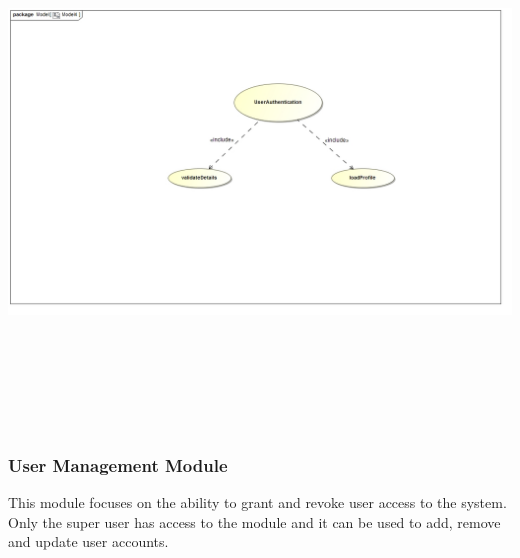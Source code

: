 \documentclass[english]{article}
\begin{document}
		\includegraphics[width=14cm,height=14cm,keepaspectratio]{Authenticate.jpg}

		\newpage
		\subsubsection{User Management Module}
		This module focuses on the ability to grant and revoke user access to the system. Only the super user has access to the module and it can be used to add, remove and update user accounts. \newline
		
\end{document}
